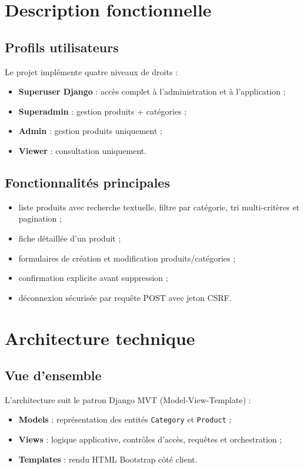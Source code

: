 \documentclass[11pt,a4paper]{article}
\begin{document}
\section{Description fonctionnelle}
\subsection{Profils utilisateurs}
Le projet impl\'emente quatre niveaux de droits :
\begin{itemize}[leftmargin=1.2cm]
  \item \textbf{Superuser Django} : acc\`es complet \`a l'administration et \`a l'application ;
  \item \textbf{Superadmin} : gestion produits + cat\'egories ;
  \item \textbf{Admin} : gestion produits uniquement ;
  \item \textbf{Viewer} : consultation uniquement.
\end{itemize}

\subsection{Fonctionnalit\'es principales}
\begin{itemize}[leftmargin=1.2cm]
  \item liste produits avec recherche textuelle, filtre par cat\'egorie, tri multi-crit\`eres et pagination ;
  \item fiche d\'etaill\'ee d'un produit ;
  \item formulaires de cr\'eation et modification produits/cat\'egories ;
  \item confirmation explicite avant suppression ;
  \item d\'econnexion s\'ecuris\'ee par requ\^ete POST avec jeton CSRF.
\end{itemize}

\section{Architecture technique}
\subsection{Vue d'ensemble}
L'architecture suit le patron Django MVT (Model-View-Template) :
\begin{itemize}[leftmargin=1.2cm]
  \item \textbf{Models} : repr\'esentation des entit\'es \texttt{Category} et \texttt{Product} ;
  \item \textbf{Views} : logique applicative, contr\^oles d'acc\`es, requ\^etes et orchestration ;
  \item \textbf{Templates} : rendu HTML Bootstrap c\^ot\'e client.
\end{itemize}
\end{document}
